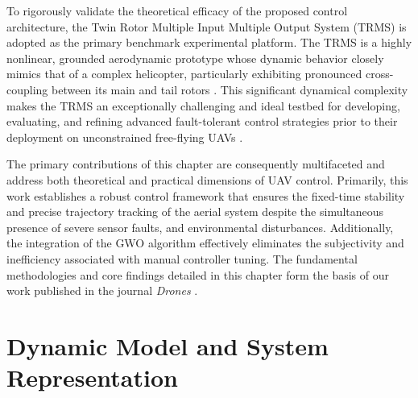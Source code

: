 To rigorously validate the theoretical efficacy of the proposed control architecture, the Twin Rotor Multiple Input Multiple Output System (TRMS) is adopted as the primary benchmark experimental platform.  The TRMS is a highly nonlinear, grounded aerodynamic prototype whose dynamic behavior closely mimics that of a complex helicopter, particularly exhibiting pronounced cross-coupling between its main and tail rotors \cite{Juang2005, trms4}. This significant dynamical complexity makes the TRMS an exceptionally challenging and ideal testbed for developing, evaluating, and refining advanced fault-tolerant control strategies prior to their deployment on unconstrained free-flying UAVs \cite{trms3}.

The primary contributions of this chapter are consequently multifaceted and address both theoretical and practical dimensions of UAV control. Primarily, this work establishes a robust control framework that ensures the fixed-time stability and precise trajectory tracking of the aerial system despite the simultaneous presence of severe sensor faults, and environmental disturbances. Additionally, the integration of the GWO algorithm effectively eliminates the subjectivity and inefficiency associated with manual controller tuning. The fundamental methodologies and core findings detailed in this chapter form the basis of our work published in the journal \textit{Drones} \cite{my1article}.

\section{Dynamic Model and System Representation}
\label{sec:trms_modeling}

